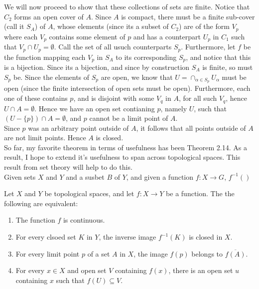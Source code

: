\documentclass{article}
\newcommand{\inv}[1]{#1^{-1}}
\newcommand{\clos}[1]{\overline{#1}}
\begin{document}
We will now proceed to show that these collections of sets are finite. Notice that $C_2$ forms an open cover of $A$. Since $A$ is compact, there must be a finite sub-cover (call it $S_A$) of $A$, whose elements (since its a subset of $C_2$) are of the form $V_p $ where each $V_p$ contains some element of $p$ and has a counterpart $U_p$ in $C_1$ such that $V_p \cap U_p = \emptyset$. Call the set of all usuch counterparts $S_p$. Furthermore, let $f$ be the function mapping each $V_p$ in $S_A$ to its corresponding $S_p$, and notice that this is a bijection. Since its a bijection, and since by construction $S_A$ is finite, so must $S_p$ be. Since the elements of $S_p$ are open, we know that $U = \cap_{\alpha\in S_p} U_\alpha$ must be open (since the finite intersection of open sets must be open). Furthermore, each one of these contains $p$, and is disjoint with some $V_q$ in $A$, for all such $V_q$, hence $U\cap A = \emptyset$. Hence we have an open set contianing $p$, namely $U$, such that $(U-\{p\})\cap A = \emptyset$, and $p$ cannot be a limit point of $A$.\\

Since $p$ was an arbitrary point outside of $A$, it follows that all points outside of $A$ are not limit points. Hence $A$ is closed.\\


So far, my favorite theorem in terms of usefulness has been Theorem 2.14. As a result, I hope to extend it's usefulness to span across topological spaces. This result from set theory will help to do this.\\

 Given sets $X$ and $Y$ and a susbet $B$ of $Y$, and given a function $f:X\rightarrow G$, $ \inv{f}() $

 Let $X$ and $Y$ be topological spaces, and let $f: X\rightarrow Y$ be a function. The the following are equivalent:
\begin{enumerate}
    \item The function $f$ is continuous.
    \item For every clsoed set $K$ in $Y$, the inverse image $ \inv{f}(K)$ is closed in $X$.
    \item For every limit point $p$ of a set $A$ in $X$, the image $f(p) $ belongs to $ \clos{f(A)}$.
    \item For every $x\in X$ and open set $V$ containing $f(x)$, there is an open set $u$ containing $x$ such that $f(U)\subseteq V$.
\end{enumerate}
\end{document}
